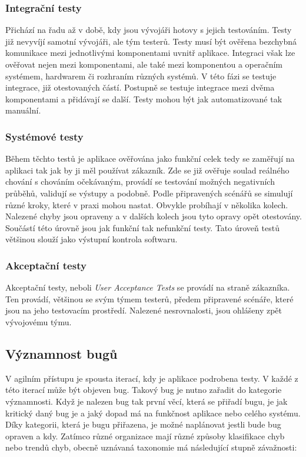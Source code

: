 \documentclass[czech,DP]{thesiskiv}
\begin{document}
\subsubsection*{Integrační testy}
Přichází na řadu až v době, kdy jsou vývojáři hotovy s jejich testováním. Testy již nevyvíjí samotní vývojáři, ale tým testerů. Testy musí být ověřena bezchybná komunikace mezi jednotlivými komponentami uvnitř aplikace. Integraci však lze ověřovat nejen mezi komponentami, ale také mezi komponentou a operačním systémem, hardwarem či rozhraním různých systémů. V této fázi se testuje integrace, již otestovaných částí. Postupně se testuje integrace mezi dvěma komponentami a přidávají se další. Testy mohou být jak automatizované tak manuální.

\subsubsection*{Systémové testy}
Během těchto testů je aplikace ověřována jako funkční celek tedy se zaměřují na aplikaci tak jak by ji měl používat zákazník. Zde se již ověřuje soulad reálného chování s chováním očekávaným, provádí se testování možných negativních průběhů, validují se výstupy a podobně. Podle připravených scénářů se simulují různé kroky, které v praxi mohou nastat. Obvykle probíhají v několika kolech. Nalezené chyby jsou opraveny a v dalších kolech jsou tyto opravy opět otestovány. Součástí této úrovně jsou jak funkční tak nefunkční testy. Tato úroveň testů většinou slouží jako výstupní kontrola softwaru.

\subsubsection*{Akceptační testy}
Akceptační testy, neboli \textit{User Acceptance Tests} se provádí na straně zákazníka. Ten provádí, většinou se svým týmem testerů, předem připravené scénáře, které jsou na jeho testovacím prostředí. Nalezené nesrovnalosti, jsou ohlášeny zpět vývojovému týmu.  


\subsection{Významnost bugů}
V agilním přístupu je spousta iterací, kdy je aplikace podrobena testy. V každé z této iterací může být objeven bug. Takový bug je nutno zařadit do kategorie významnosti. Když je nalezen bug tak první věcí, která se přiřadí bugu, je jak kritický daný bug je a jaký dopad má na funkčnost aplikace nebo celého systému.  Díky kategorii, která je bugu přiřazena, je možné naplánovat jestli bude bug opraven a kdy. Zatímco různé organizace mají různé způsoby klasifikace chyb nebo trendů chyb, obecně uznávaná taxonomie má následující stupně závažnosti\citep{1989managing}:
\end{document}
